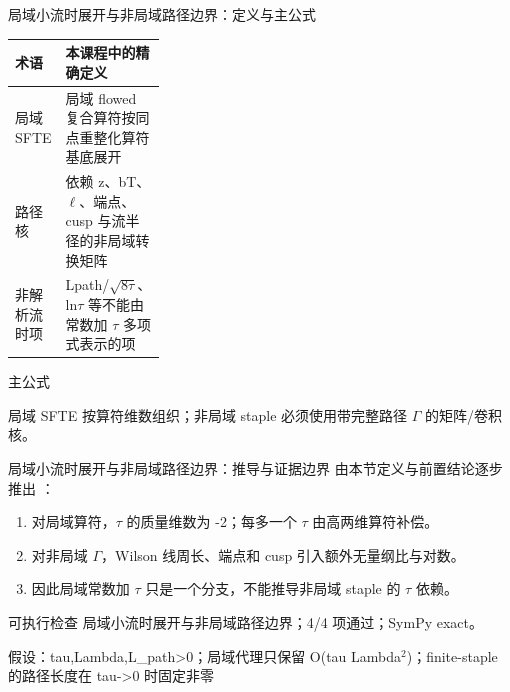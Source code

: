 \begin{frame}[t]{局域小流时展开与非局域路径边界：定义与主公式}
\footnotesize\begin{tabularx}{\linewidth}{p{0.30\linewidth}Y}
\toprule 术语 & 本课程中的精确定义\\\midrule
{} 局域 SFTE & 局域 flowed 复合算符按同点重整化算符基底展开\\
 路径核 & 依赖 z、bT、\ensuremath{\ell}、端点、cusp 与流半径的非局域转换矩阵\\
 非解析流时项 & Lpath/\allowbreak{}\ensuremath{\sqrt{8\tau}}、ln\ensuremath{\tau} 等不能由常数加 \ensuremath{\tau} 多项式表示的项\\
\bottomrule\end{tabularx}\vspace{0.15cm}
\begin{block}{ 主公式}\centering{}\end{block}
局域 SFTE 按算符维数组织；非局域 staple 必须使用带完整路径 \ensuremath{\Gamma} 的矩阵/\allowbreak{}卷积核。
\end{frame}

\begin{frame}[t]{局域小流时展开与非局域路径边界：推导与证据边界}
\footnotesize
{}\quad 由本节定义与前置结论逐步推出 ：
\begin{enumerate}
\item 对局域算符，\ensuremath{\tau} 的质量维数为 -2；每多一个 \ensuremath{\tau} 由高两维算符补偿。
\item 对非局域 \ensuremath{\Gamma}，Wilson 线周长、端点和 cusp 引入额外无量纲比与对数。
\item 因此局域常数加 \ensuremath{\tau} 只是一个分支，不能推导非局域 staple 的 \ensuremath{\tau} 依赖。
\end{enumerate}\begin{block}{可执行检查}
\quad 局域小流时展开与非局域路径边界；4/4 项通过；SymPy exact。
\par\scriptsize 假设：tau,Lambda,L\_path>0；局域代理只保留 O(tau Lambda\ensuremath{^{2}})；finite-staple 的路径长度在 tau->0 时固定非零
\end{block}
\end{frame}

